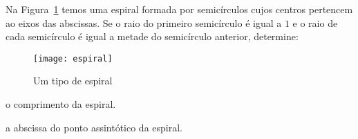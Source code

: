 \documentclass{ativmatUFRB}
\begin{document}
%
\titulo %
\begin{atividade} %
%

\questao Na Figura~\ref{fig:espiral} temos uma espiral formada por semicírculos
cujos centros pertencem ao eixos das abscissas. Se o raio do primeiro 
semicírculo é igual a $1$ e o raio de cada semicírculo é igual a metade do 
semicírculo anterior, determine:

\begin{figure}[!h] %
 \centering %
 \texttt{[image: espiral]} %
 \caption{Um tipo de espiral} %
 \label{fig:espiral} %
\end{figure}

\begin{itens} %
 \item o comprimento da espiral. \Resp{$2\pi$} %
 \item a abscissa do ponto assintótico da espiral. 
\end{itens}


\end{atividade}
\end{document}
